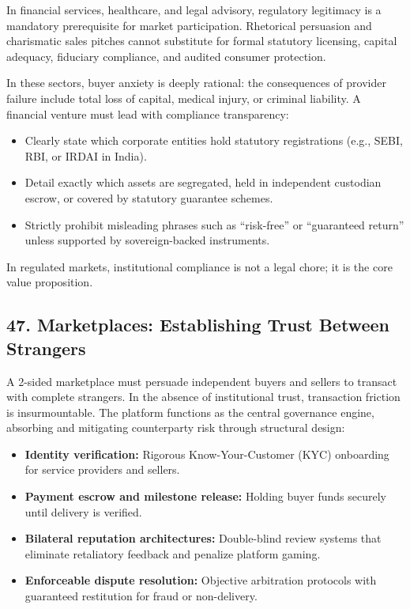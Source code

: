 In financial services, healthcare, and legal advisory, regulatory legitimacy is a mandatory prerequisite for market participation. Rhetorical persuasion and charismatic sales pitches cannot substitute for formal statutory licensing, capital adequacy, fiduciary compliance, and audited consumer protection.

In these sectors, buyer anxiety is deeply rational: the consequences of provider failure include total loss of capital, medical injury, or criminal liability. A financial venture must lead with compliance transparency:
\begin{itemize}
\item Clearly state which corporate entities hold statutory registrations (e.g., SEBI, RBI, or IRDAI in India).
\item Detail exactly which assets are segregated, held in independent custodian escrow, or covered by statutory guarantee schemes.
\item Strictly prohibit misleading phrases such as ``risk-free'' or ``guaranteed return'' unless supported by sovereign-backed instruments.
\end{itemize}

In regulated markets, institutional compliance is not a legal chore; it is the core value proposition.

\subsection*{47. Marketplaces: Establishing Trust Between Strangers}

A 2-sided marketplace must persuade independent buyers and sellers to transact with complete strangers. In the absence of institutional trust, transaction friction is insurmountable. The platform functions as the central governance engine, absorbing and mitigating counterparty risk through structural design:
\begin{itemize}
\item \textbf{Identity verification:} Rigorous Know-Your-Customer (KYC) onboarding for service providers and sellers.
\item \textbf{Payment escrow and milestone release:} Holding buyer funds securely until delivery is verified.
\item \textbf{Bilateral reputation architectures:} Double-blind review systems that eliminate retaliatory feedback and penalize platform gaming.
\item \textbf{Enforceable dispute resolution:} Objective arbitration protocols with guaranteed restitution for fraud or non-delivery.
\end{itemize}

